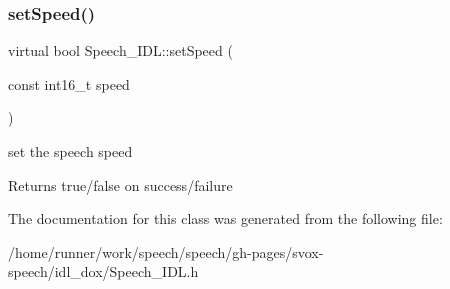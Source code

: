 \subsubsection{\texorpdfstring{set\+Speed()}{setSpeed()}}
{\footnotesize\ttfamily virtual bool Speech\+\_\+\+I\+D\+L\+::set\+Speed (\begin{DoxyParamCaption}\item[{const int16\+\_\+t}]{speed }\end{DoxyParamCaption})\hspace{0.3cm}{\ttfamily [virtual]}}



set the speech speed 

\begin{DoxyReturn}{Returns}
true/false on success/failure 
\end{DoxyReturn}


The documentation for this class was generated from the following file\+:\begin{DoxyCompactItemize}
\item 
/home/runner/work/speech/speech/gh-\/pages/svox-\/speech/idl\+\_\+dox/Speech\+\_\+\+I\+D\+L.\+h\end{DoxyCompactItemize}
